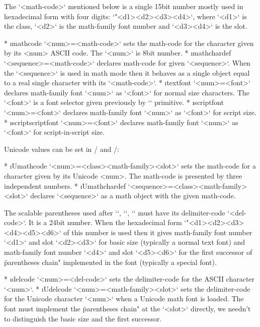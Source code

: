 {The `<math-code>` mentioned below is a single 15bit number mostly used in hexadecimal
form with four digits: `"<d1><d2><d3><d4>`, where `<d1>` is the class, `<d2>` is
the math-family font number and `<d3><d4>` is the slot.

\begitems
* \i mathcode `\mathcode <num>=<math-code>` sets the math-code for the character given
  by its <num> ASCII code. The `<num>` is 8bit number.
* \i mathchardef `\mathchardef <sequence>=<math-code>` declares math-code for
  given `<sequence>`. When the `<sequence>` is used in math mode then it behaves
  as a single object equal to a real single character with its `<math-code>`.
* \i textfont `\textfont<num>=<font>` declares math-family font `<num>` as
  `<font>` for normal size characters. The `<font>` is a font selector given
  previously by `\font` primitive.
* \i scriptfont `\scriptfont<num>=<font>` declares math-family font `<num>` as
  `<font>` for script size.
* \i scriptscriptfont `\scriptscriptfont<num>=<font>` declares math-family font `<num>` as
  `<font>` for script-in-script size.
\enditems

Unicode values can be set in \XeTeX/ and \LuaTeX/:

\begitems
* \*\*\*\i Umathcode `\Umathcode<num>=<class><math-family><slot>` sets
  the math-code for a character given by its Unicode <num>. The math-code is
  presented by three independent numbers.
* \*\*\*\i Umathchardef `\Umathchardef<sequence>=<class><math-family><slot>`
  declares `<sequence>` as a math object with the given math-code.
\enditems

The scalable parentheses used after `\left`, `\right`, `\middle` must have
its delimiter-code `<del-code>`. It is a
24bit number. When the hexadecimal form `"<d1><d2><d3><d4><d5><d6>` of this
number is used then it gives
math-family font number `<d1>` and slot `<d2><d3>` for basic size (typically
a normal text font) and
math-family font number `<d4>` and slot `<d5><d6>` for the first successor of
\"parentheses chain" implemented in the font (typically a special font).

\begitems
* \i delcode `\delcode<num>=<del-code>` sets the delimiter-code for the
  ASCII character `<num>`.
* \*\*\*\i Udelcode `\Udelcode<num>=<math-family><slot>` sets the
  delimiter-code for the Unicode character `<num>` when a Unicode math font is
  loaded. The font must implement the \"parentheses chain" at the `<slot>`
  directly, we needn't to distinguish the basic size and the first
  successor.
\enditems


}
